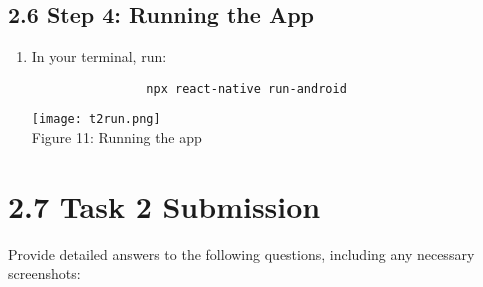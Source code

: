 \documentclass{article}
\begin{document}
        \subsection*{2.6 Step 4: Running the App}

        \begin{enumerate}
            \item In your terminal, run:
                \begin{verbatim}
                npx react-native run-android
                \end{verbatim}

             \centering
                        \texttt{[image: t2run.png]}\\
                        \caption{Figure 11: Running the app}
        \end{enumerate}

        \section*{2.7 Task 2 Submission}

        Provide detailed answers to the following questions, including any necessary screenshots:
\end{document}
